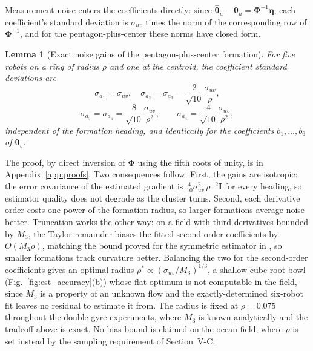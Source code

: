 \documentclass[lettersize,journal]{IEEEtran}
\newtheorem{lemma}{Lemma}
\begin{document}
Measurement noise enters the coefficients directly: since
$\hat{\boldsymbol{\theta}}_u - \boldsymbol{\theta}_u =
\boldsymbol{\Phi}^{-1}\boldsymbol{\eta}$, each coefficient's standard
deviation is $\sigma_{uv}$ times the norm of the corresponding row of
$\boldsymbol{\Phi}^{-1}$, and for the pentagon-plus-center these norms
have closed form.

\begin{lemma}[Exact noise gains of the pentagon-plus-center formation]
\label{lem:gains}
For five robots on a ring of radius $\rho$ and one at the centroid, the
coefficient standard deviations are
\begin{equation}
    \sigma_{a_1} = \sigma_{uv}, \quad
    \sigma_{a_2} = \sigma_{a_3} = \frac{2}{\sqrt{10}}\frac{\sigma_{uv}}{\rho},
    \label{eq:gain_grad}
\end{equation}
\begin{equation}
    \sigma_{a_5} = \sigma_{a_6} = \frac{8}{\sqrt{10}}
    \frac{\sigma_{uv}}{\rho^2},
    \qquad
    \sigma_{a_4} = \frac{4}{\sqrt{10}}\frac{\sigma_{uv}}{\rho^2},
    \label{eq:gain_hess}
\end{equation}
independent of the formation heading, and identically for the
coefficients $b_1, \ldots, b_6$ of $\boldsymbol{\theta}_v$.
\end{lemma}

The proof, by direct inversion of $\boldsymbol{\Phi}$ using the fifth
roots of unity, is in Appendix~\ref{app:proofs}. Two consequences
follow. First, the gains are isotropic: the error covariance of the
estimated gradient is $\tfrac{4}{10}\sigma_{uv}^2\,\rho^{-2}\mathbf{I}$
for every heading, so estimator quality does not degrade as the cluster
turns. Second, each derivative order costs one power of the formation
radius, so larger formations average noise better. Truncation works the
other way: on a field with third derivatives bounded by $M_3$, the
Taylor remainder biases the fitted second-order coefficients by $O(M_3
\rho)$, matching the bound proved for the symmetric estimator in
\cite{15}, so smaller formations track curvature better. Balancing the two for the
second-order coefficients gives an optimal radius $\rho^* \propto
(\sigma_{uv}/M_3)^{1/3}$, a shallow cube-root bowl (Fig.~\ref{fig:est_accuracy}(b))
whose flat optimum is not computable in the field, since $M_3$ is a
property of an unknown flow and the exactly-determined six-robot fit
leaves no residual to estimate it from. The radius is fixed at $\rho =
0.075$ throughout the double-gyre experiments, where $M_3$ is known
analytically and the tradeoff above is exact. No bias bound is claimed
on the ocean field, where $\rho$ is set instead by the sampling
requirement of Section~\mbox{V-C}.
\end{document}
